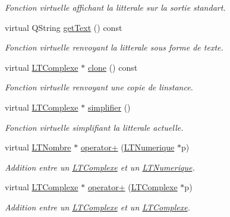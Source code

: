\begin{DoxyCompactItemize}
\begin{DoxyCompactList}\small\item\em Fonction virtuelle affichant la litterale sur la sortie standart. \end{DoxyCompactList}\item 
virtual Q\+String \hyperlink{class_l_t_complexe_a25992476892bbc3a33ea61dba8bc9160}{get\+Text} () const 
\begin{DoxyCompactList}\small\item\em Fonction virtuelle renvoyant la litterale sous forme de texte. \end{DoxyCompactList}\item 
virtual \hyperlink{class_l_t_complexe}{L\+T\+Complexe} $\ast$ \hyperlink{class_l_t_complexe_ae597257b1e7b81ad6914e44b616c006d}{clone} () const 
\begin{DoxyCompactList}\small\item\em Fonction virtuelle renvoyant une copie de l\textquotesingle{}instance. \end{DoxyCompactList}\item 
virtual \hyperlink{class_l_t_complexe}{L\+T\+Complexe} $\ast$ \hyperlink{class_l_t_complexe_aa4781a2130c4dd2daa81fde8caa6fff3}{simplifier} ()
\begin{DoxyCompactList}\small\item\em Fonction virtuelle simplifiant la litterale actuelle. \end{DoxyCompactList}\item 
virtual \hyperlink{class_l_t_nombre}{L\+T\+Nombre} $\ast$ \hyperlink{class_l_t_complexe_a834cd6715b51f95ad10368fd6e024cdd}{operator+} (\hyperlink{class_l_t_numerique}{L\+T\+Numerique} $\ast$p)
\begin{DoxyCompactList}\small\item\em Addition entre un \hyperlink{class_l_t_complexe}{L\+T\+Complexe} et un \hyperlink{class_l_t_numerique}{L\+T\+Numerique}. \end{DoxyCompactList}\item 
virtual \hyperlink{class_l_t_complexe}{L\+T\+Complexe} $\ast$ \hyperlink{class_l_t_complexe_ac5cb2f0522ce3776b63995047048be3f}{operator+} (\hyperlink{class_l_t_complexe}{L\+T\+Complexe} $\ast$p)
\begin{DoxyCompactList}\small\item\em Addition entre un \hyperlink{class_l_t_complexe}{L\+T\+Complexe} et un \hyperlink{class_l_t_complexe}{L\+T\+Complexe}. \end{DoxyCompactList}\item 

\end{DoxyCompactItemize}
